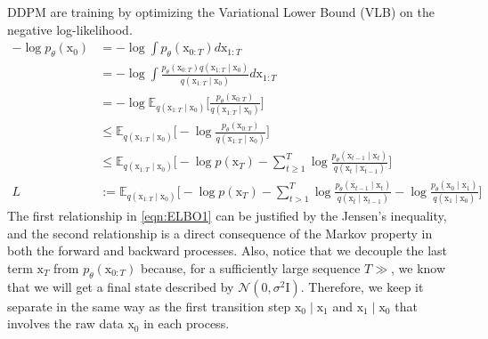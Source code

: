     DDPM are training by optimizing the Variational Lower Bound (VLB)
    on the negative log-likelihood.
    \begin{equation}\label{eqn:ELBO1}
    \begin{split} 
    -\log p_{\theta}(\mathrm{x}_{0}) &= -\log\int p_{\theta}(\mathrm{x}_{0:T}) d\mathrm{x}_{1:T} \\
    &= -\log \int \frac{p_{\theta}(\mathrm{x}_{0:T})q(\mathrm{x}_{1:T}\mid\mathrm{x}_{0})}{q(\mathrm{x}_{1:T}\mid\mathrm{x}_{0})}d\mathrm{x}_{1:T} \\
    &= - \log \mathbb{E}_{q(\mathrm{x}_{1:T}\mid\mathrm{x}_0)} \bigg[\frac{p_{\theta}(\mathrm{x}_{0:T})}{q(\mathrm{x}_{1:T}\mid\mathrm{x}_{0})} \bigg] \\
    & \leq \mathbb{E}_{q(\mathrm{x}_{1:T}\mid\mathrm{x}_{0})}\bigg[-\log \frac{p_{\theta}(\mathrm{x}_{0:T})}{q(\mathrm{x}_{1:T}\mid\mathrm{x}_{0})}\bigg] \\
    &\leq \mathbb{E}_{q(\mathrm{x}_{1:T}\mid\mathrm{x}_{0})}\bigg[-\log p(\mathrm{x}_{T}) - \sum_{t\geq 1}^{T} \log\frac{p_{\theta}(\mathrm{x}_{t-1}\mid\mathrm{x}_{t})}{q(\mathrm{x}_{t}\mid\mathrm{x}_{t-1})} \bigg] \\
    L &:= \mathbb{E}_{q(\mathrm{x}_{1:T}\mid\mathrm{x}_{0})}\bigg[-\log p(\mathrm{x}_{T}) - \sum_{t>1}^{T} \log \frac{p_{\theta}(\mathrm{x}_{t-1}\mid\mathrm{x}_{t})}{q(\mathrm{x}_{t}\mid\mathrm{x}_{t-1})}-\log\frac{p_{\theta}(\mathrm{x}_{0}\mid\mathrm{x}_{1})}{q(\mathrm{x}_{1}\mid\mathrm{x}_{0})}\bigg]
    \end{split}
    \end{equation}
    The first relationship in \ref{eqn:ELBO1} can be justified by the Jensen's inequality, and the second relationship is a direct consequence of the Markov property in both the forward and backward processes. Also, notice that we decouple the last term $\mathrm{x}_{T}$ from $p_{\theta}(\mathrm{x}_{0:T})$ because,
    for a sufficiently large sequence $T\gg$, we know that we will get a final state described by $\mathcal{N}(0, \sigma^2\mathrm{I})$. Therefore, we keep it separate in the same way as the first transition step $\mathrm{x}_{0}\mid\mathrm{x_{1}}$ and $\mathrm{x}_1\mid\mathrm{x}_0$ that involves the raw data $\mathrm{x}_{0}$ in each process.\\
    
